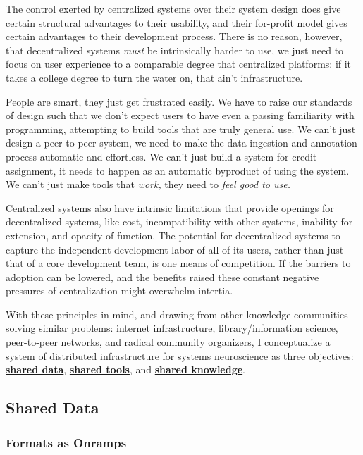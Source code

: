 \documentclass[10pt]{article}
\begin{document}
\begin{multicols}{2}
The control exerted by centralized systems over their system design does
give certain structural advantages to their usability, and their
for-profit model gives certain advantages to their development process.
There is no reason, however, that decentralized systems \emph{must} be
intrinsically harder to use, we just need to focus on user experience to
a comparable degree that centralized platforms: if it takes a college
degree to turn the water on, that ain't infrastructure.

People are smart, they just get frustrated easily. We have to raise our
standards of design such that we don't expect users to have even a
passing familiarity with programming, attempting to build tools that are
truly general use. We can't just design a peer-to-peer system, we need
to make the data ingestion and annotation process automatic and
effortless. We can't just build a system for credit assignment, it needs
to happen as an automatic byproduct of using the system. We can't just
make tools that \emph{work,} they need to \emph{feel good to use.}

Centralized systems also have intrinsic limitations that provide
openings for decentralized systems, like cost, incompatibility with
other systems, inability for extension, and opacity of function. The
potential for decentralized systems to capture the independent
development labor of all of its users, rather than just that of a core
development team, is one means of competition. If the barriers to
adoption can be lowered, and the benefits raised these constant negative
pressures of centralization might overwhelm intertia.

With these principles in mind, and drawing from other knowledge
communities solving similar problems: internet infrastructure,
library/information science, peer-to-peer networks, and radical
community organizers, I conceptualize a system of distributed
infrastructure for systems neuroscience as three objectives:
\protect\hyperlink{shared-data}{\textbf{shared data}},
\protect\hyperlink{shared-tools}{\textbf{shared tools}}, and
\protect\hyperlink{shared-knowledge}{\textbf{shared knowledge}}.

\end{multicols}


\hypertarget{shared-data}{%
\subsection{Shared Data}\label{shared-data}}

\hypertarget{formats-as-onramps}{%
\subsubsection{Formats as Onramps}\label{formats-as-onramps}}
\end{document}
